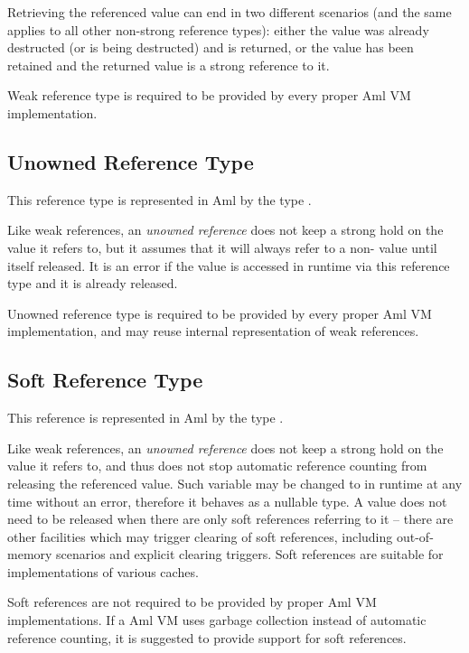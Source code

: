 Retrieving the referenced value can end in two different scenarios (and the same applies to all other non-strong reference types): either the value was already destructed (or is being destructed) and  is returned, or the value has been retained and the returned value is a strong reference to it. 

Weak reference type is required to be provided by every proper Aml VM implementation. 





\subsection{Unowned Reference Type}

This reference type is represented in Aml by the type . 

Like weak references, an {\em unowned reference} does not keep a strong hold on the value it refers to, but it assumes that it will always refer to a non- value until itself released. It is an error if the value is accessed in runtime via this reference type and it is already released. 

Unowned reference type is required to be provided by every proper Aml VM implementation, and may reuse internal representation of weak references. 





\subsection{Soft Reference Type}

This reference is represented in Aml by the type . 

Like weak references, an {\em unowned reference} does not keep a strong hold on the value it refers to, and thus does not stop automatic reference counting from releasing the referenced value. Such variable may be changed to  in runtime at any time without an error, therefore it behaves as a nullable type. A value does not need to be released when there are only soft references referring to it -- there are other facilities which may trigger clearing of soft references, including out-of-memory scenarios and explicit clearing triggers. Soft references are suitable for implementations of various caches. 

Soft references are not required to be provided by proper Aml VM implementations. If a Aml VM uses garbage collection instead of automatic reference counting, it is suggested to provide support for soft references. 

